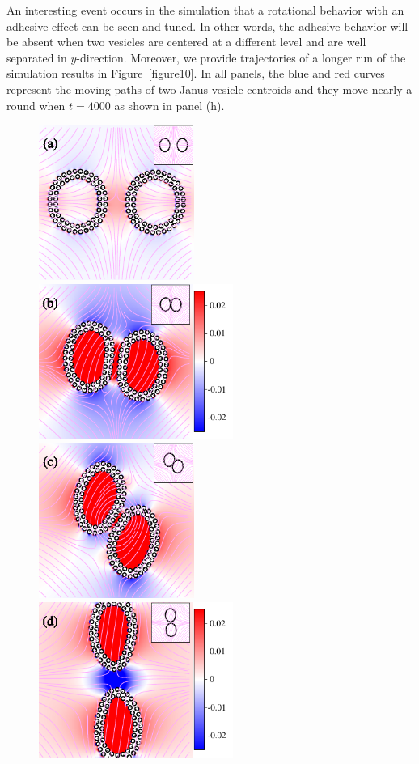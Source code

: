 \documentclass[lineno]{jfm}
\begin{document}
An interesting event occurs in the simulation that a rotational behavior with an adhesive effect can be seen and tuned. In other words, the adhesive behavior will be absent when two vesicles are centered 
at a different level and are well separated in $y$-direction. 
Moreover, we provide trajectories of a longer run of the simulation results in Figure~\ref{figure10}. In all panels, the blue and red curves represent the moving paths of two Janus-vesicle centroids and they move
nearly a round when $t=4000$ as shown in panel (h).





\begin{figure}
\centering
\includegraphics[height=2in]{N116_ext_0.pdf}
\includegraphics[height=2in]{N116_ext_2000.pdf}\\
\includegraphics[height=2in]{N116_ext_4000.pdf}
\includegraphics[height=2in]{N116_ext_6500.pdf}

\end{figure}
\end{document}
